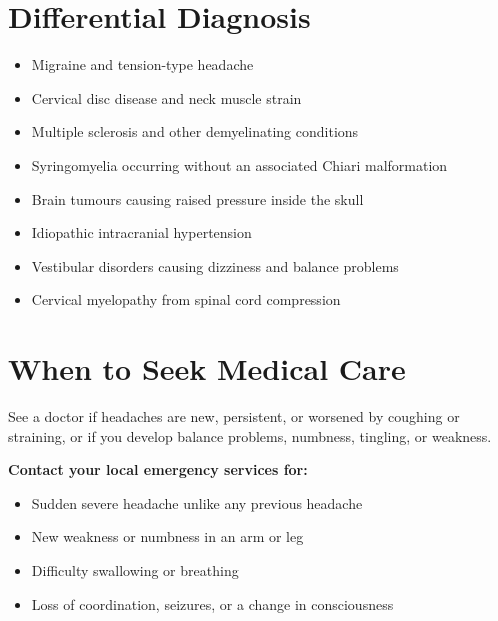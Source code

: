 \section*{Differential Diagnosis}
\begin{itemize}
    \item Migraine and tension-type headache
    \item Cervical disc disease and neck muscle strain
    \item Multiple sclerosis and other demyelinating conditions
    \item Syringomyelia occurring without an associated Chiari malformation
    \item Brain tumours causing raised pressure inside the skull
    \item Idiopathic intracranial hypertension
    \item Vestibular disorders causing dizziness and balance problems
    \item Cervical myelopathy from spinal cord compression
\end{itemize}

\section*{When to Seek Medical Care}
See a doctor if headaches are new, persistent, or worsened by coughing or straining, or if you develop balance problems, numbness, tingling, or weakness.

\medskip
\textbf{Contact your local emergency services for:}
\begin{itemize}
    \item Sudden severe headache unlike any previous headache
    \item New weakness or numbness in an arm or leg
    \item Difficulty swallowing or breathing
    \item Loss of coordination, seizures, or a change in consciousness
\end{itemize}

